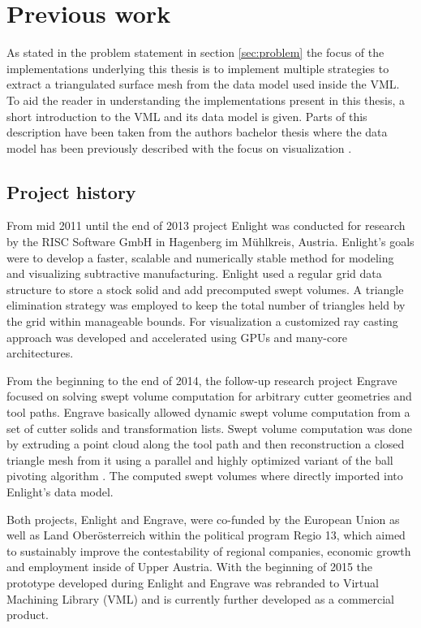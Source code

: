 \chapter{Previous work}
\label{ch:previous_work}

As stated in the problem statement in section \ref{sec:problem} the focus of the implementations underlying this thesis is to implement multiple strategies to extract a triangulated surface mesh from the data model used inside the VML.
To aid the reader in understanding the implementations present in this thesis, a short introduction to the VML and its data model is given.
Parts of this description have been taken from the authors bachelor thesis where the data model has been previously described with the focus on visualization \cite{bachelor}.

\section{Project history}
\label{sec:project_history}

From mid 2011 until the end of 2013 project Enlight was conducted for research by the RISC Software GmbH in Hagenberg im M\"uhlkreis, Austria.
Enlight's goals were to develop a faster, scalable and numerically stable method for modeling and visualizing subtractive manufacturing.
Enlight used a regular grid data structure to store a stock solid and add precomputed swept volumes.
A triangle elimination strategy was employed to keep the total number of triangles held by the grid within manageable bounds.
For visualization a customized ray casting approach was developed \cite{enlight} and accelerated using GPUs and many-core architectures.

From the beginning to the end of 2014, the follow-up research project Engrave focused on solving swept volume computation for arbitrary cutter geometries and tool paths.
Engrave basically allowed dynamic swept volume computation from a set of cutter solids and transformation lists.
Swept volume computation was done by extruding a point cloud along the tool path and then reconstruction a closed triangle mesh from it using a parallel and highly optimized variant of the ball pivoting algorithm 
\cite{engrave}.
The computed swept volumes where directly imported into Enlight's data model.

Both projects, Enlight and Engrave, were co-funded by the European Union as well as Land Ober\"osterreich within the political program Regio 13, which aimed to sustainably improve the contestability of regional companies, economic growth and employment inside of Upper Austria.
%
With the beginning of 2015 the prototype developed during Enlight and Engrave was rebranded to Virtual Machining Library (VML) and is currently further developed as a commercial product.

